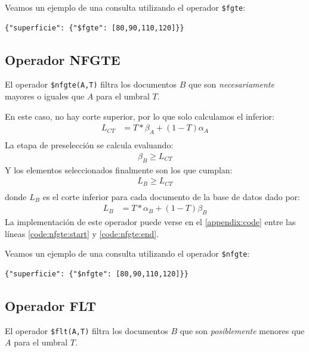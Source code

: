 \begin{example}
Veamos un ejemplo de una consulta utilizando el operador \texttt{\$fgte}:
%
\begin{verbatim}
{"superficie": {"$fgte": [80,90,110,120]}}
\end{verbatim}

\end{example}

\subsection{Operador NFGTE}

El operador \texttt{\$nfgte(A,T)} filtra los documentos $B$ que son \textit{necesariamente} mayores o iguales que $A$ para el umbral $T$.

En este caso, no hay corte superior, por lo que solo calculamos el inferior:
%
\begin{align*}
    L_{CT} &= T * \beta_A + (1-T)\alpha_A \\
\end{align*}
%
La etapa de preselección se calcula evaluando:
%
\begin{align*}
    \beta_B \geq L_{CT}
\end{align*}
%
Y los elementos seleccionados finalmente son los que cumplan:
%
\begin{align*}
    L_B \geq L_{CT} \\
\end{align*}
%
donde $L_B$ es el corte inferior para cada documento de la base de datos dado por:
%
\begin{align*}
    L_B &= T * \alpha_B + (1-T)\beta_B
\end{align*}
%
La implementación de este operador puede verse en el \autoref{appendix:code} entre las líneas \ref{code:nfgte:start} y \ref{code:nfgte:end}.

\begin{example}
Veamos un ejemplo de una consulta utilizando el operador \texttt{\$nfgte}:
%
\begin{verbatim}
{"superficie": {"$nfgte": [80,90,110,120]}}
\end{verbatim}

\end{example}

\subsection{Operador FLT}

El operador \texttt{\$flt(A,T)} filtra los documentos $B$ que son \textit{posiblemente} menores que $A$ para el umbral $T$.

